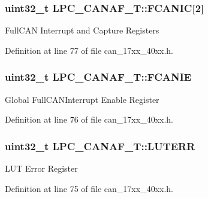 \subsubsection[{\texorpdfstring{F\+C\+A\+N\+IC}{FCANIC}}]{ uint32\+\_\+t L\+P\+C\+\_\+\+C\+A\+N\+A\+F\+\_\+\+T\+::\+F\+C\+A\+N\+IC\mbox{[}2\mbox{]}}\hypertarget{structLPC__CANAF__T_a89079a08d1150a7761dff98d0130d7e5}{}\label{structLPC__CANAF__T_a89079a08d1150a7761dff98d0130d7e5}
Full\+C\+AN Interrupt and Capture Registers 

Definition at line 77 of file can\+\_\+17xx\+\_\+40xx.\+h.

\subsubsection[{\texorpdfstring{F\+C\+A\+N\+IE}{FCANIE}}]{ uint32\+\_\+t L\+P\+C\+\_\+\+C\+A\+N\+A\+F\+\_\+\+T\+::\+F\+C\+A\+N\+IE}\hypertarget{structLPC__CANAF__T_aca9607036e23ed6523777c80e1ab1147}{}\label{structLPC__CANAF__T_aca9607036e23ed6523777c80e1ab1147}
Global Full\+C\+A\+N\+Interrupt Enable Register 

Definition at line 76 of file can\+\_\+17xx\+\_\+40xx.\+h.

\subsubsection[{\texorpdfstring{L\+U\+T\+E\+RR}{LUTERR}}]{ uint32\+\_\+t L\+P\+C\+\_\+\+C\+A\+N\+A\+F\+\_\+\+T\+::\+L\+U\+T\+E\+RR}\hypertarget{structLPC__CANAF__T_acd4acbf7638e632b78feaccdba530c88}{}\label{structLPC__CANAF__T_acd4acbf7638e632b78feaccdba530c88}
L\+UT Error Register 

Definition at line 75 of file can\+\_\+17xx\+\_\+40xx.\+h.

